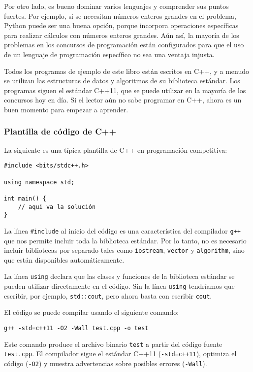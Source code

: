 Por otro lado, es bueno
dominar varios lenguajes y comprender
sus puntos fuertes.
Por ejemplo, si se necesitan números enteros grandes
en el problema,
Python puede ser una buena opción, porque
incorpora operaciones específicas para
realizar cálculos con números enteros grandes.
Aún así, la mayoría de los problemas en los concursos de programación
están configurados para que
el uso de un lenguaje de programación específico
no sea una ventaja injusta.

Todos los programas de ejemplo de este libro están escritos en C++,
y a menudo se utilizan las estructuras de datos y algoritmos 
de su biblioteca estándar.
Los programas siguen el estándar C++11,
que se puede utilizar en la mayoría de los concursos hoy en día.
Si el lector aún no sabe programar en C++,
ahora es un buen momento para empezar a aprender.

\subsubsection{Plantilla de código de C++}

La siguiente es una típica plantilla de C++
en programación competitiva:

\begin{lstlisting}
#include <bits/stdc++.h>

using namespace std;

int main() {
    // aqui va la solución
}
\end{lstlisting}

La línea \texttt{\#include} al inicio
del código es una característica del compilador \texttt{g++}
que nos permite incluir toda la biblioteca estándar.
Por lo tanto, no es necesario incluir bibliotecas 
por separado tales como \texttt{iostream},
\texttt{vector} y \texttt{algorithm},
sino que están disponibles automáticamente.

La línea \texttt{using} declara
que las clases y funciones
de la biblioteca estándar se pueden utilizar directamente
en el código.
Sin la línea \texttt{using} tendríamos que
escribir, por ejemplo, \texttt{std::cout},
pero ahora basta con escribir \texttt{cout}.

El código se puede compilar usando el siguiente comando:

\begin{lstlisting}
g++ -std=c++11 -O2 -Wall test.cpp -o test
\end{lstlisting}

Este comando produce el archivo binario \texttt{test}
a partir del código fuente \texttt{test.cpp}.
El compilador sigue el estándar C++11
(\texttt{-std=c++11}),
optimiza el código (\texttt{-O2})
y muestra advertencias sobre posibles errores  (\texttt{-Wall}).

